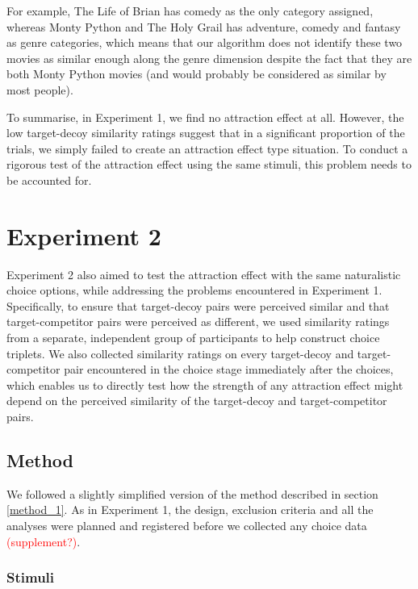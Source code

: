 \documentclass[11pt,a4paper]{article}
\begin{document}
 For example, The Life of Brian has comedy as the only category assigned, whereas Monty Python and The Holy Grail has adventure, comedy and fantasy as genre categories, which means that our algorithm does not identify these two movies as similar enough along the genre dimension despite the fact that they are both Monty Python movies (and would probably be considered as similar by most people).
 
 To summarise, in Experiment 1, we find no attraction effect at all. However, the  low target-decoy similarity ratings suggest that in a significant proportion of the trials, we simply failed to create an attraction effect type situation. To conduct a rigorous test of the attraction effect using the same stimuli, this problem needs to be accounted for.
 
\newpage

\section{Experiment 2} 


Experiment 2 also aimed to test the attraction effect with the same naturalistic choice options, while addressing the problems encountered in Experiment 1. Specifically, to ensure that target-decoy pairs were perceived similar and that target-competitor pairs were perceived as different, we used similarity ratings from a  separate, independent group of participants to help construct choice triplets. We also collected similarity ratings on every target-decoy and target-competitor pair encountered in the choice stage immediately after the choices, which enables us to directly test how the strength of any attraction effect might depend on the perceived similarity of the target-decoy and target-competitor pairs.

\subsection{Method}

We followed a slightly simplified version of the method described in section \ref{method_1}. As in Experiment 1, the design, exclusion criteria and all the analyses were planned and registered before we collected any choice data \textcolor{red} {(supplement?)}. 

\subsubsection{Stimuli}
\end{document}
